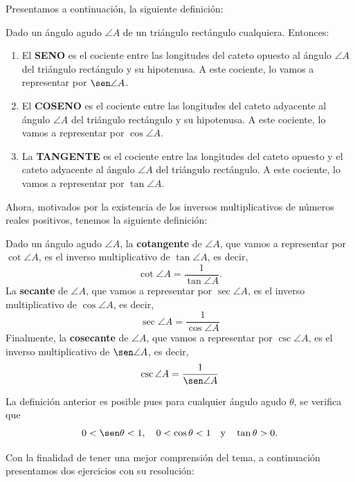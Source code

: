 \documentclass[12pt]{article}
\begin{document}
Presentamos a continuaci\'on, la siguiente definici\'on:
\begin{defi} Dado un \'angulo agudo $\angle A$ de un tri\'angulo rect\'angulo cualquiera. Entonces: 
\begin{enumerate}
    \item El \textbf{SENO} es el cociente entre las longitudes del cateto opuesto al \'angulo $\angle A$ del tri\'angulo rect\'angulo y su hipotenusa. A este cociente, lo vamos a representar por $\sen \angle A$.
    \item El \textbf{COSENO} es el cociente entre las longitudes del cateto adyacente  al \'angulo $\angle A$ del tri\'angulo rect\'angulo y su hipotenusa. A este cociente, lo vamos a representar por $\cos \angle A$.
    \item La \textbf{TANGENTE } es el cociente entre las longitudes del cateto opuesto y el cateto adyacente al \'angulo $\angle A$ del tri\'angulo rect\'angulo. A este cociente, lo vamos a representar por $\tan \angle A$.
\end{enumerate}
\end{defi}
 Ahora, motivados por la existencia de los inversos multiplicativos de n\'umeros reales positivos, tenemos la siguiente definici\'on:
\begin{defi}
Dado un \'angulo agudo $\angle A$, la \textbf{cotangente} de $\angle A$, que vamos a representar por $\cot \angle A$, es el inverso multiplicativo de $\tan \angle A$, es decir, 
\[
\cot \angle A = \frac{1}{\tan \angle A}.
\]
    La \textbf{secante} de $\angle A$, que vamos a representar por $\sec \angle A$, es el inverso multiplicativo de $\cos \angle A$, es decir, 
\[
\sec \angle A = \frac{1}{\cos \angle  A}
\]
Finalmente, la \textbf{cosecante} de $\angle A$, que vamos a representar por $\csc \angle A$, es el inverso multiplicativo de $\sen \angle A$, es decir, 
\[
\csc \angle A = \frac{1}{\sen \angle A}
\]
\end{defi}
\begin{see}
    La definici\'on anterior es posible pues para cualquier \'angulo agudo $\theta$, se verifica que 
    \[
    0< \sen \theta <1 , \quad 0< \cos \theta <1 \yds \tan \theta >0.
    \]
\end{see}
Con la finalidad de tener una mejor comprensi\'on del tema, a continuaci\'on presentamos dos ejercicios con su resoluci\'on:
\end{document}
